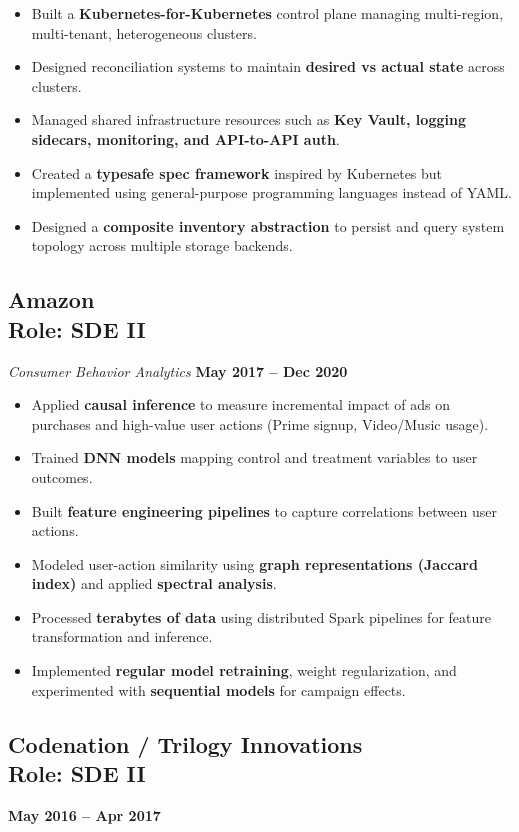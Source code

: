 \documentclass[11pt,letterpaper]{article}
\begin{document}
\begin{itemize}[leftmargin=*,noitemsep]
    \item Built a \textbf{Kubernetes-for-Kubernetes} control plane managing multi-region, multi-tenant, heterogeneous clusters.
    \item Designed reconciliation systems to maintain \textbf{desired vs actual state} across clusters.
    \item Managed shared infrastructure resources such as \textbf{Key Vault, logging sidecars, monitoring, and API-to-API auth}.
    \item Created a \textbf{typesafe spec framework} inspired by Kubernetes but implemented using general-purpose programming languages instead of YAML.
    \item Designed a \textbf{composite inventory abstraction} to persist and query system topology across multiple storage backends.
\end{itemize}

\subsection{Amazon \\ Role: SDE II}
\textit{Consumer Behavior Analytics} \hfill \textbf{May 2017 -- Dec 2020}

\begin{itemize}[leftmargin=*,noitemsep]
    \item Applied \textbf{causal inference} to measure incremental impact of ads on purchases and high-value user actions (Prime signup, Video/Music usage).
    \item Trained \textbf{DNN models} mapping control and treatment variables to user outcomes.
    \item Built \textbf{feature engineering pipelines} to capture correlations between user actions.
    \item Modeled user-action similarity using \textbf{graph representations (Jaccard index)} and applied \textbf{spectral analysis}.
    \item Processed \textbf{terabytes of data} using distributed Spark pipelines for feature transformation and inference.
    \item Implemented \textbf{regular model retraining}, weight regularization, and experimented with \textbf{sequential models} for campaign effects.
\end{itemize}

\subsection{Codenation / Trilogy Innovations \\ Role: SDE II}
\hfill \textbf{May 2016 -- Apr 2017}
\end{document}

